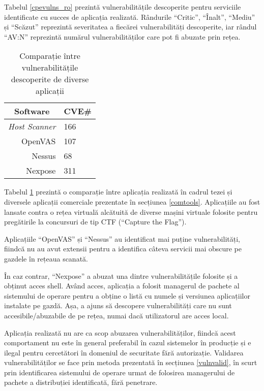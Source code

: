 	Tabelul \ref{cpevulns_ro} prezintă vulnerabilitățile descoperite pentru serviciile identificate cu succes de aplicația realizată. Rândurile ``Critic'', ``Înalt'', ``Mediu'' și ``Scăzut'' reprezintă severitatea a fiecărei vulnerabilități descoperite, iar rândul ``AV:N'' reprezintă numărul vulnerabilităților care pot fi abuzate prin rețea.
	
	\begin{table}[H]
		\centering
		\begin{tabular}{|r|l|}
			\hline
			\multicolumn{1}{|c|}{\textbf{Software}} & \multicolumn{1}{c|}{\textbf{CVE\#}} \\ \hline
			\textit{Host Scanner\footnotemark{}}                   & 166                                 \\
			OpenVAS                                 & 107                                 \\
			Nessus                                  & 68                                  \\
			Nexpose                                 & 311                                 \\ \hline
		\end{tabular}
		\caption{Comparație între vulnerabilitățile descoperite de diverse aplicații}
		\label{foundvulns_ro}
	\end{table}
	
	Tabelul \ref{foundvulns_ro} prezintă o comparație între aplicația realizată în cadrul tezei și diversele aplicații comerciale prezentate în secțiunea \ref{comtools}. Aplicațiile au fost lansate contra o rețea virtuală alcătuită de diverse mașini virtuale folosite pentru pregătirile la concursuri de tip CTF (``Capture the Flag'').
	
	Aplicațiile ``OpenVAS'' și ``Nessus'' au identificat mai puține vulnerabilități, fiindcă nu au avut extensii pentru a identifica câteva servicii mai obscure pe gazdele în rețeaua scanată.
	
	În caz contrar, ``Nexpose'' a abuzat una dintre vulnerabilitățile folosite și a obținut acces shell. Având acces, aplicația a folosit managerul de pachete al sistemului de operare pentru a obține o listă cu numele și versiunea aplicațiilor instalate pe gazdă. Așa, a ajuns să descopere vulnerabilități care nu sunt accesibile/abuzabile de pe rețea, numai dacă utilizatorul are acces local.
	
	Aplicația realizată nu are ca scop abuzarea vulnerabilităților, fiindcă acest comportament nu este în general preferabil în cazul sistemelor în producție și e ilegal pentru cercetători în domeniul de securitate fără autorizație. Validarea vulnerabilităților se face prin metoda prezentată în secțiunea \ref{vulnvalid}, în scurt prin identificarea sistemului de operare urmat de folosirea managerului de pachete a distribuției identificată, fără penetrare.
